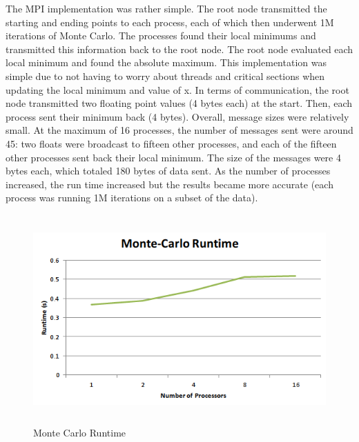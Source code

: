 \documentclass[notitlepage, letterpaper, 12pt]{report}
\begin{document}
The MPI implementation was rather simple.  The root node transmitted the starting and ending points to each process, each of which then underwent 1M iterations of Monte Carlo.  The processes found their local minimums and transmitted this information back to the root node.  The root node evaluated each local minimum and found the absolute maximum.  This implementation was simple due to not having to worry about threads and critical sections when updating the local minimum and value of x.  In terms of communication, the root node transmitted two floating point values (4 bytes each) at the start.  Then, each process sent their minimum back (4 bytes).  Overall, message sizes were relatively small.  At the maximum of 16 processes, the number of messages sent were around 45: two floats were broadcast to fifteen other processes, and each of the fifteen other processes sent back their local minimum.  The size of the messages were 4 bytes each, which totaled 180 bytes of data sent.  As the number of processes increased, the run time increased but the results became more accurate (each process was running 1M iterations on a subset of the data).

\begin{figure}[H]
	\includegraphics[width=\linewidth,height=8cm,keepaspectratio]{q2.png}
	\caption[Monte Carlo Runtime]{Monte Carlo Runtime}
	\label{fig:arch}
\end{figure}
\end{document}

